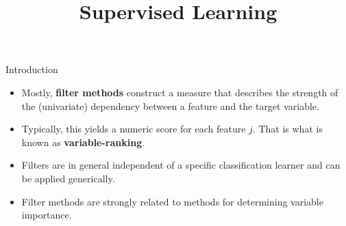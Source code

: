 \documentclass[11pt,compress,t,notes=noshow, xcolor=table]{beamer}
\title{Supervised Learning}
\date{}
\begin{document}

  \begin{vbframe}{Introduction}

  \begin{itemize}
    \item Mostly, \textbf{filter methods} construct a measure that describes the strength of the (univariate) dependency between a feature and the target variable.
    \item Typically, this yields a numeric score for each feature $j$.
    That is what is known as \textbf{variable-ranking}.
    \item Filters are in general independent of a specific classification learner and can be applied generically.
      \item Filter methods are strongly related to methods for determining variable importance.
  \end{itemize}
  \end{vbframe}
\end{document}
